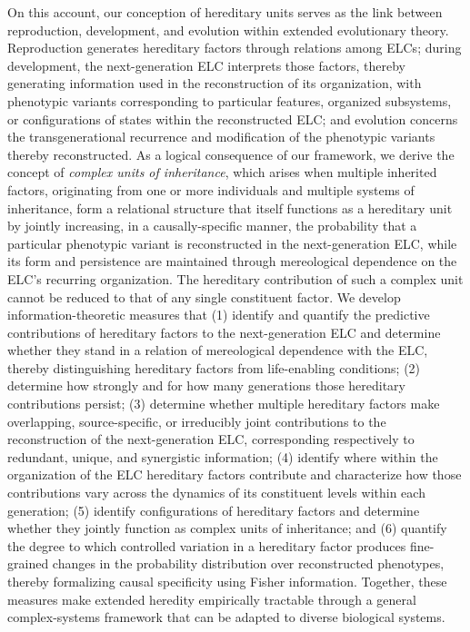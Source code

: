 \documentclass[pdflatex,sn-mathphys-num]{sn-jnl}
\theoremstyle{thmstylethree}
\theoremstyle{thmstyleone}
\begin{document}
On this account, our conception of hereditary units serves as the link between reproduction, development, and evolution within extended evolutionary theory. Reproduction generates hereditary factors through relations among ELCs; during development, the next-generation ELC interprets those factors, thereby generating information used in the reconstruction of its organization, with phenotypic variants corresponding to particular features, organized subsystems, or configurations of states within the reconstructed ELC; and evolution concerns the transgenerational recurrence and modification of the phenotypic variants thereby reconstructed. As a logical consequence of our framework, we derive the concept of \textit{complex units of inheritance}, which arises when multiple inherited factors, originating from one or more individuals and multiple systems of inheritance, form a relational structure that itself functions as a hereditary unit by jointly increasing, in a causally-specific manner, the probability that a particular phenotypic variant is reconstructed in the next-generation ELC, while its form and persistence are maintained through mereological dependence on the ELC’s recurring organization. The hereditary contribution of such a complex unit cannot be reduced to that of any single constituent factor. We develop information-theoretic measures that (1) identify and quantify the predictive contributions of hereditary factors to the next-generation ELC and determine whether they stand in a relation of mereological dependence with the ELC, thereby distinguishing hereditary factors from life-enabling conditions; (2) determine how strongly and for how many generations those hereditary contributions persist; (3) determine whether multiple hereditary factors make overlapping, source-specific, or irreducibly joint contributions to the reconstruction of the next-generation ELC, corresponding respectively to redundant, unique, and synergistic information; (4) identify where within the organization of the ELC hereditary factors contribute and characterize how those contributions vary across the dynamics of its constituent levels within each generation; (5) identify configurations of hereditary factors and determine whether they jointly function as complex units of inheritance; and (6) quantify the degree to which controlled variation in a hereditary factor produces fine-grained changes in the probability distribution over reconstructed phenotypes, thereby formalizing causal specificity using Fisher information. Together, these measures make extended heredity empirically tractable through a general complex-systems framework that can be adapted to diverse biological systems. 
\end{document}
